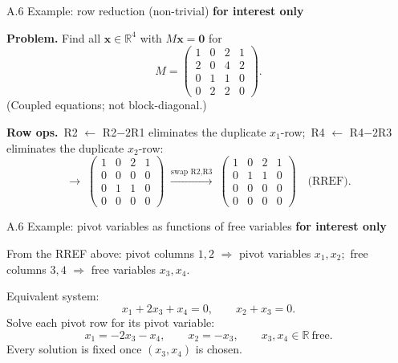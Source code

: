 \documentclass[11pt,aspectratio=169]{beamer}
\newcommand{\InterestOnly}{\textcolor{mAccent}{\textbf{for interest only}}}
\begin{document}
\begin{frame}{A.6 Example: row reduction (non-trivial)}
  \footnotesize
  \InterestOnly

  \medskip
  \textbf{Problem.} Find all $\mathbf{x}\in\mathbb{R}^4$ with $M\mathbf{x}=\mathbf{0}$ for
  \[
    M=
    \begin{pmatrix}
      1&0&2&1\\
      2&0&4&2\\
      0&1&1&0\\
      0&2&2&0
    \end{pmatrix}.
  \]
  (Coupled equations; not block-diagonal.)

  \medskip
  \textbf{Row ops.}\
  R2 $\leftarrow$ R2$-2$R1 eliminates the duplicate $x_1$-row;\
  R4 $\leftarrow$ R4$-2$R3 eliminates the duplicate $x_2$-row:
  \[
    \longrightarrow\;
    \begin{pmatrix}
      1&0&2&1\\
      0&0&0&0\\
      0&1&1&0\\
      0&0&0&0
    \end{pmatrix}
    \;\xrightarrow{\text{swap R2,R3}}\;
    \begin{pmatrix}
      1&0&2&1\\
      0&1&1&0\\
      0&0&0&0\\
      0&0&0&0
    \end{pmatrix}
    \quad\text{(RREF).}
  \]
\end{frame}

\begin{frame}{A.6 Example: pivot variables as functions of free variables}
  \footnotesize
  \InterestOnly

  \medskip
  From the RREF above: pivot columns $1,2$ $\Rightarrow$ pivot variables $x_1,x_2$;\
  free columns $3,4$ $\Rightarrow$ free variables $x_3,x_4$.

  \medskip
  Equivalent system:
  \[
    x_1+2x_3+x_4=0,\qquad x_2+x_3=0.
  \]
  Solve each pivot row for its pivot variable:
  \[
    x_1=-2x_3-x_4,\qquad x_2=-x_3,\qquad x_3,x_4\in\mathbb{R}\ \text{free}.
  \]
  Every solution is fixed once $(x_3,x_4)$ is chosen.
\end{frame}
\end{document}
